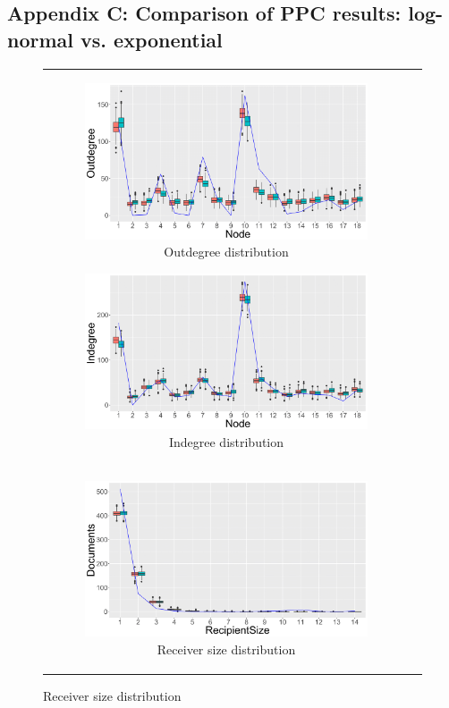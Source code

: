 \documentclass[ba]{imsart}
\numberwithin{equation}{section}
\theoremstyle{plain}
\begin{document}
		\subsection*{Appendix C: Comparison of PPC results: log-normal vs. exponential}\label{appendix: PPCexp}
		\begin{figure}[H]
			\centering
			\begin{tabular}[t]{cc}
				\begin{subfigure}[b]{0.495\textwidth}
					\caption{Outdegree distribution}
					\includegraphics[width=\textwidth]{img/outdegree2-1.png}	
				\end{subfigure}
				\begin{subfigure}[b]{0.495\textwidth}
					\caption{Indegree distribution}
					\includegraphics[width=\textwidth]{img/indegree2-1.png}	
				\end{subfigure}\\
				\begin{subfigure}[b]{0.495\textwidth}
					\caption{Receiver size distribution}
					\includegraphics[width=\textwidth]{img/recipientsize2-1.png}	

\end{subfigure}
\end{tabular}
\end{figure}
\end{document}
